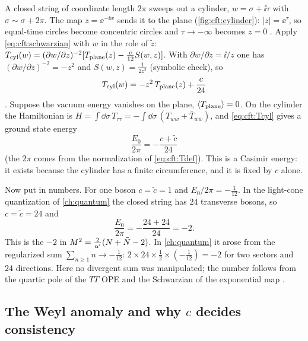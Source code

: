 A closed string of coordinate length $2\pi$ sweeps out a cylinder, $w=\sigma+\ii\tau$ with
$\sigma\sim\sigma+2\pi$. The map $z=\ee^{-\ii w}$ sends it to the plane
(\cref{fig:cft:cylinder}): $|z|=\ee^{\tau}$, so equal-time circles become concentric circles and
$\tau\to-\infty$ becomes $z=0$ . Apply
\eqref{eq:cft:schwarzian} with $w$ in the role of $\tilde z$:
$T_{\rm cyl}(w)=(\partial w/\partial z)^{-2}[T_{\rm plane}(z)-\frac c{12}S(w,z)]$. With
$\partial w/\partial z=\ii/z$ one has $(\partial w/\partial z)^{-2}=-z^2$ and
$S(w,z)=\frac{1}{2z^2}$ (symbolic check), so
\begin{equation}\label{eq:cft:Tcyl}
  T_{\rm cyl}(w)=-z^2\,T_{\rm plane}(z)+\frac{c}{24}
\end{equation}
. Suppose the vacuum energy vanishes on the plane,
$\langle T_{\rm plane}\rangle=0$. On the cylinder the Hamiltonian is
$H=\int\dd\sigma\,T_{\tau\tau}=-\int\dd\sigma\,(T_{ww}+\bar T_{\bar w\bar w})$, and
\eqref{eq:cft:Tcyl} gives a ground state energy
\begin{equation}\label{eq:cft:casimir}
  \frac{E_0}{2\pi}=-\frac{c+\tilde c}{24}
\end{equation}
 (the $2\pi$ comes from the normalization of
\eqref{eq:cft:Tdef}). This is a Casimir energy: it exists because the cylinder has a finite
circumference, and it is fixed by $c$ alone.

Now put in numbers. For one boson $c=\tilde c=1$ and $E_0/2\pi=-\frac1{12}$. In the light-cone
quantization of \cref{ch:quantum} the closed string has $24$ transverse bosons, so
$c=\tilde c=24$ and
\[
  \frac{E_0}{2\pi}=-\frac{24+24}{24}=-2 .
\]
This is the $-2$ in $M^2=\frac2{\alpha'}(N+\tilde N-2)$. In \cref{ch:quantum} it arose from the
regularized sum $\sum_{n\ge1}n\to-\frac1{12}$: $2\times24\times\frac12\times(-\frac1{12})=-2$ for
two sectors and $24$ directions. Here no divergent sum was manipulated; the number follows from
the quartic pole of the $TT$ OPE and the Schwarzian of the exponential map
.

\subsection{The Weyl anomaly and why \texorpdfstring{$c$}{c} decides consistency}

